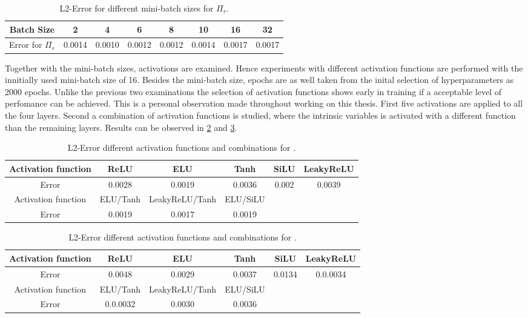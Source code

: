 \begin{table}[!htbp]\centering
	\begin{tabular}{ |c|c|c|c|c|c|c|c| }
		\hline
		Batch Size & 2 & 4 & 6 & 8 & 10 & 16 & 32 \\ [.5ex]
		\hline
		Error for \(\Pi_r\)& 0.0014 & 0.0010 & 0.0012 & 0.0012 & 0.0014 & 0.0017 & 0.0017\\ \hline
	\end{tabular}
	\caption{L2-Error for different mini-batch sizes for \(\Pi_r\).}
	\label{Tab:Batch Size Rare}
\end{table}
Together with the mini-batch sizes, activations are examined. Hence experiments with different activation functions are performed with the innitially used mini-batch size of 16. Besides the mini-batch size, epochs are as well taken from the inital selection of hyperparameters as 2000 epochs. Unlike the previous two examinations the selection of activation functions shows early in training if a acceptable level of perfomance can be achieved. This is a personal observation made throughout working on this thesis. First five activations are applied to all the four layers. Second a combination of activation functions is studied, where the intrinsic variables is activated with a different function than the remaining layers. Results can be observed in \cref{Tab:Activations Hydro} and \cref{Tab:Activations Rare}.
\begin{table}[!htbp]\centering
	\begin{tabular}{ |c|c|c|c|c|c| }
		\hline
		Activation function & ReLU & ELU & Tanh & SiLU & LeakyReLU \\ [.5ex]
		\hline
		Error & 0.0028 & 0.0019 & 0.0036 & 0.002 & 0.0039\\ \hline
		Activation function & ELU/Tanh & LeakyReLU/Tanh & ELU/SiLU & & \\ [.5ex]
		\hline
		Error & 0.0019 & 0.0017 & 0.0019 &  & \\ \hline
	\end{tabular}
	\caption{L2-Error different activation functions and combinations for \hy.}
	\label{Tab:Activations Hydro}
\end{table}
\begin{table}[!htbp]\centering
	\begin{tabular}{ |c|c|c|c|c|c| }
		\hline
		Activation function & ReLU & ELU & Tanh & SiLU & LeakyReLU \\ [.5ex]
		\hline
		Error & 0.0048 & 0.0029 & 0.0037 & 0.0134 & 0.0.0034\\ \hline
		Activation function & ELU/Tanh & LeakyReLU/Tanh & ELU/SiLU & & \\ [.5ex]
		\hline
		Error & 0.0.0032 & 0.0030 & 0.0036 &  & \\ \hline
	\end{tabular}
	\caption{L2-Error different activation functions and combinations for \rare.}
	\label{Tab:Activations Rare} 
\end{table}
